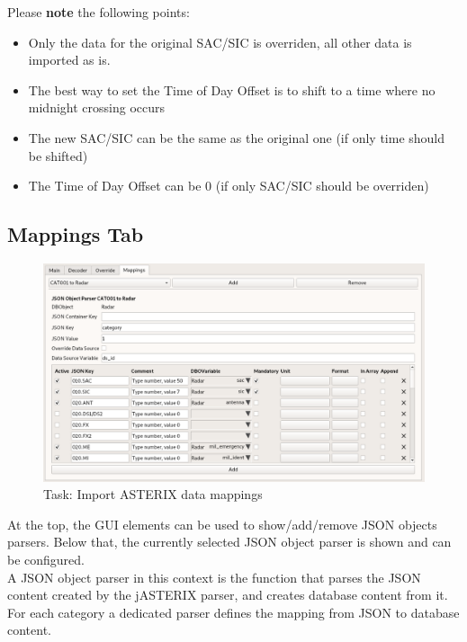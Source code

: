 Please \textbf{note} the following points:

\begin{itemize}  
\item Only the data for the original SAC/SIC is overriden, all other data is imported as is.
\item The best way to set the Time of Day Offset is to shift to a time where no midnight crossing occurs
\item The new SAC/SIC can be the same as the original one (if only time should be shifted)
\item The Time of Day Offset can be 0 (if only SAC/SIC should be overriden)
\end{itemize}

\subsection{Mappings Tab}

\begin{figure}[H]
  \hspace*{-2.5cm}
    \includegraphics[width=19cm,frame]{../screenshots/asterix_import_data_mappings.png}
  \caption{Task: Import ASTERIX data mappings}
\end{figure}

At the top, the GUI elements can be used to show/add/remove JSON objects parsers. Below that, the currently selected JSON object parser is shown and can be configured. \\

A JSON object parser in this context is the function that parses the JSON content created by the jASTERIX parser, and creates database content from it. For each category a dedicated parser defines the mapping from JSON to database content. \\

